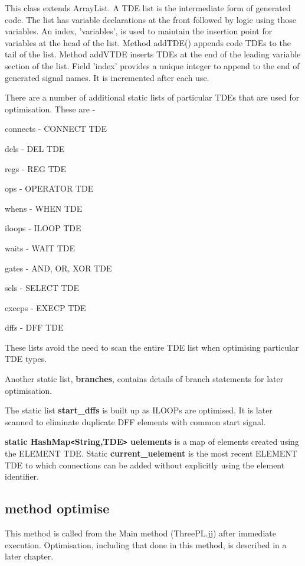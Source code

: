 This class extends ArrayList. A TDE list is the intermediate form of generated
code. The list has variable declarations at the front followed by logic using
those variables. An index, 'variables', is used to maintain the insertion point
for variables at the head of the list. Method addTDE() appends code TDEs to the
tail of the list. Method addVTDE inserts TDEs at the end of the leading variable
section of the list. Field 'index' provides a unique integer to append to the
end of generated signal names. It is incremented after each use.

There are a number of additional static lists of particular TDEs that are used
for optimisation. These are -

\blist
\item connects - CONNECT TDE
\item dels - DEL TDE
\item regs - REG TDE
\item ops - OPERATOR TDE
\item whens - WHEN TDE
\item iloops - ILOOP TDE
\item waits - WAIT TDE
\item gates - AND, OR, XOR TDE
\item sels - SELECT TDE
\item execps - EXECP TDE
\item dffs - DFF TDE
\blend

These lists avoid the need to scan the entire TDE list when optimising
particular TDE types.

Another static list, {\bf branches}, contains details of branch statements for
later optimisation.

The static list {\bf start\_dffs} is built up as ILOOPs are optimised. It is
later scanned to eliminate duplicate DFF elements with common start signal.

{\bf static  HashMap\verb'<'String,TDE\verb'>' uelements} is a map of
elements created using the ELEMENT TDE. Static {\bf current\_uelement} is
the most recent ELEMENT TDE to which connections can be added without
explicitly using the element identifier.



\subsection{method optimise}

    This method is called from the Main method (ThreePL.jj) after
    immediate execution. Optimisation, including that done in this
    method, is described in a later chapter.

